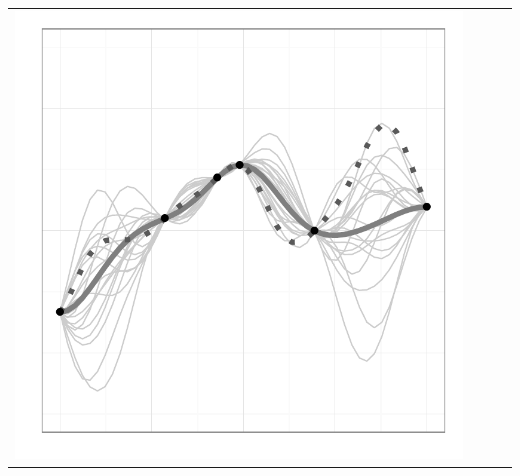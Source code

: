 \documentclass[a4paper,natbib]{apa6}
\begin{document}
\begin{table}[h!]
\begin{tabular}{lccc}
\includegraphics[scale=0.2]{figure17.pdf}
\\


\end{tabular}
\end{table}
\end{document}
